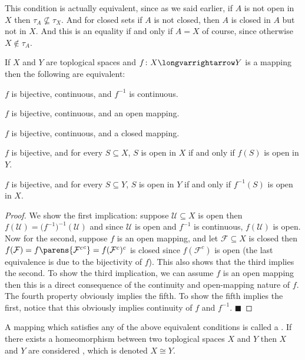 \documentclass[10pt]{article}
\def\qed{\hskip1cm\penalty-100\hbox{}\hfill$\blacksquare$}
\def\mU{\mathcal{U}}
\def\mF{\mathcal{F}}
\def\longto{\longvarrightarrow}
\begin{document}
This condition is actually equivalent, since as we said earlier, if $A$ is not open in $X$ then $\tau_A\not\subseteq\tau_X$.
And for closed sets if $A$ is not closed, then $A$ is closed in $A$ but not in $X$.
And this is an equality if and only if $A=X$ of course, since otherwise $X\notin\tau_A$.

\begin{thrm*}

    If $X$ and $Y$ are toplogical spaces and $f\colon X\longto Y$ is a mapping then the following are equivalent:
    \benum
        \item $f$ is bijective, continuous, and $f^{-1}$ is continuous.
        \item $f$ is bijective, continuous, and an open mapping.
        \item $f$ is bijective, continuous, and a closed mapping.
        \item $f$ is bijective, and for every $S\subseteq X$, $S$ is open in $X$ if and only if $f(S)$ is open in $Y$.
        \item $f$ is bijective, and for every $S\subseteq Y$, $S$ is open in $Y$ if and only if $f^{-1}(S)$ is open in $X$.
    \eenum

\end{thrm*}

\begin{proof}

    We show the first implication: suppose $\mU\subseteq X$ is open then $f(\mU)=\bigl(f^{-1}\bigr)^{-1}(\mU)$ and since $\mU$ is open and $f^{-1}$ is continuous, $f(\mU)$ is open.
    Now for the second, suppose $f$ is an open mapping, and let $\mF\subseteq X$ is closed then $f(\mF)=f\parens{{\mF^c}^c}=f(\mF^c)^c$ is closed since $f(\mF^c)$ is open (the last equivalence is due to the
    bijectivity of $f$).
    This also shows that the third implies the second.
    To show the third implication, we can assume $f$ is an open mapping then this is a direct consequence of the continuity and open-mapping nature of $f$.
    The fourth property obviously implies the fifth.
    To show the fifth implies the first, notice that this obviously implies continuity of $f$ and $f^{-1}$.
    \qed

\end{proof}

\begin{defn*}

    A mapping which satisfies any of the above equivalent conditions is called a .
    If there exists a homeomorphism between two toplogical spaces $X$ and $Y$ then $X$ and $Y$ are considered , which is denoted $X\cong Y$.

\end{defn*}
\end{document}
